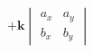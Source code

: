 \documentclass[preview]{standalone}
\begin{document}
\begin{align*}
+\mathbf{k} \begin{vmatrix} a_x & a_y \\ b_x & b_y \end{vmatrix}
\end{align*}
\end{document}
